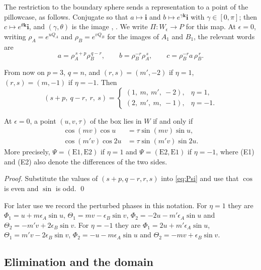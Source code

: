 The restriction to the boundary sphere sends a representation to a point of the pillowcase, as follows.
Conjugate so that $a\mapsto\mathbf i$ and $b\mapsto e^{\gamma\mathbf k}\mathbf i$ with $\gamma\in[0,\pi]$; then
$c\mapsto e^{\theta\mathbf k}\mathbf i$, and $(\gamma,\theta)$ is the image \cite[Prop.~6.1]{HHK2}, \cite[Thm.~11.1]{HHK1}.
We write $\Pi\colon W_\epsilon\to P$ for this map. At $\epsilon=0$, writing $\rho_A=e^{uQ_A}$ and $\rho_B=e^{vQ_B}$ for the
images of $A_1$ and $B_1$, the relevant words are \cite[(42)]{HHK1}
\begin{equation}\label{eq:words}
a=\rho_A^{\,s+p}\rho_B^{\,q-r},\qquad b=\rho_B^{-r}\rho_A^{\,s},\qquad c=\rho_B^{-r}a\,\rho_B^{\,r}.
\end{equation}

From now on $p=3$, $q=n$, and $(r,s)=(m',-2)$ if $\eta=1$, $(r,s)=(m,-1)$ if $\eta=-1$. Then
\[
(s+p,\ q-r,\ r,\ s)=\begin{cases}(1,\ m,\ m',\ -2),&\eta=1,\\(2,\ m',\ m,\ -1),&\eta=-1.\end{cases}
\]

\begin{lemma}\label{lem:normalform}
At $\epsilon=0$, a point $(u,v,\tau)$ of the box lies in $W$ if and only if
\begin{align}
\cos(mv)\cos u&=\tau\sin(mv)\sin u,\tag{E1}\label{eq:E1}\\
\cos(m'v)\cos2u&=\tau\sin(m'v)\sin2u.\tag{E2}\label{eq:E2}
\end{align}
More precisely, $\Psi=(\mathrm{E1},\mathrm{E2})$ if $\eta=1$ and $\Psi=(\mathrm{E2},\mathrm{E1})$ if $\eta=-1$, where (E1) and (E2) also
denote the differences of the two sides.
\end{lemma}

\begin{proof}
Substitute the values of $(s+p,q-r,r,s)$ into \eqref{eq:Psi} and use that $\cos$ is even and $\sin$ is odd. \qed
\end{proof}

For later use we record the perturbed phases in this notation. For $\eta=1$ they are
$\Phi_1=u+m\epsilon_A\sin u$, $\Theta_1=mv-\epsilon_B\sin v$, $\Phi_2=-2u-m'\epsilon_A\sin u$ and
$\Theta_2=-m'v+2\epsilon_B\sin v$. For $\eta=-1$ they are $\Phi_1=2u+m'\epsilon_A\sin u$, $\Theta_1=m'v-2\epsilon_B\sin v$,
$\Phi_2=-u-m\epsilon_A\sin u$ and $\Theta_2=-mv+\epsilon_B\sin v$.

\subsection{Elimination and the domain}\label{sec:domain}

